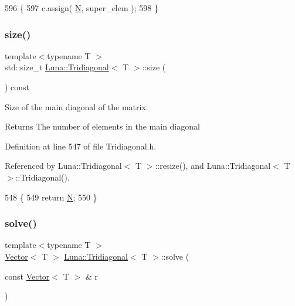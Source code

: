 \begin{DoxyCode}
596   \{
597     c.assign( \hyperlink{namespaceHeat__plot_a7d050092798e28458a263710837bda77}{N}, super\_elem );
598   \}
\end{DoxyCode}
\mbox{\label{classLuna_1_1Tridiagonal_ae8586e82968a8c28f7c50008e1f75411}} 
\subsubsection{\texorpdfstring{size()}{size()}}
{\footnotesize\ttfamily template$<$typename T $>$ \\
std\+::size\+\_\+t \hyperlink{classLuna_1_1Tridiagonal}{Luna\+::\+Tridiagonal}$<$ T $>$\+::size (\begin{DoxyParamCaption}{ }\end{DoxyParamCaption}) const\hspace{0.3cm}{\ttfamily [inline]}}



Size of the main diagonal of the matrix. 

\begin{DoxyReturn}{Returns}
The number of elements in the main diagonal 
\end{DoxyReturn}


Definition at line 547 of file Tridiagonal.\+h.



Referenced by Luna\+::\+Tridiagonal$<$ T $>$\+::resize(), and Luna\+::\+Tridiagonal$<$ T $>$\+::\+Tridiagonal().


\begin{DoxyCode}
548   \{
549     \textcolor{keywordflow}{return} \hyperlink{namespaceHeat__plot_a7d050092798e28458a263710837bda77}{N};
550   \}
\end{DoxyCode}
\mbox{\label{classLuna_1_1Tridiagonal_a760fdf1ceb44e2ff380770eefb13d023}} 
\subsubsection{\texorpdfstring{solve()}{solve()}\hspace{0.1cm}{\footnotesize\ttfamily [1/2]}}
{\footnotesize\ttfamily template$<$typename T $>$ \\
\hyperlink{classLuna_1_1Vector}{Vector}$<$ T $>$ \hyperlink{classLuna_1_1Tridiagonal}{Luna\+::\+Tridiagonal}$<$ T $>$\+::solve (\begin{DoxyParamCaption}\item[{const \hyperlink{classLuna_1_1Vector}{Vector}$<$ T $>$ \&}]{r }\end{DoxyParamCaption})\hspace{0.3cm}{\ttfamily [inline]}}



